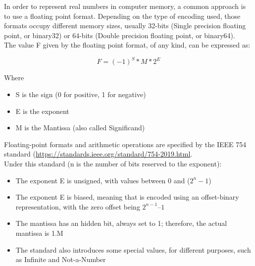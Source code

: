 In order to represent real numbers in computer memory, a common approach is to use a floating point format. Depending on the type of encoding used, those formats occupy different memory sizes, usually 32-bits (Single precision floating point, or binary32) or 64-bits (Double precision floating point, or binary64). \\
The value F given by the floating point format, of any kind, can be expressed as:

$$F = (-1)^{S}*M*2^{E} $$

Where 
\begin{itemize}
	\item S is the sign (0 for positive, 1 for negative)
	\item E is the exponent
	\item M is the Mantissa (also called Significand)
\end{itemize}

Floating-point formats and arithmetic operations are specified by the IEEE 754 standard (\url{https://standards.ieee.org/standard/754-2019.html}. \\
Under this standard (n is the number of bits reserved to the exponent):
\begin{itemize}
	\item The exponent E is unsigned, with values between 0 and ($2^{n} -1$)
	\item	The exponent E is biased, meaning that is encoded using an offset-binary representation, with the zero offset being 			$2^{n-1} – 1$
	\item	The mantissa has an hidden bit, always set to 1; therefore, the actual mantissa is 1.M
	\item	The standard also introduces some special values, for different purposes, such as Infinite and Not-a-Number
\end{itemize}

